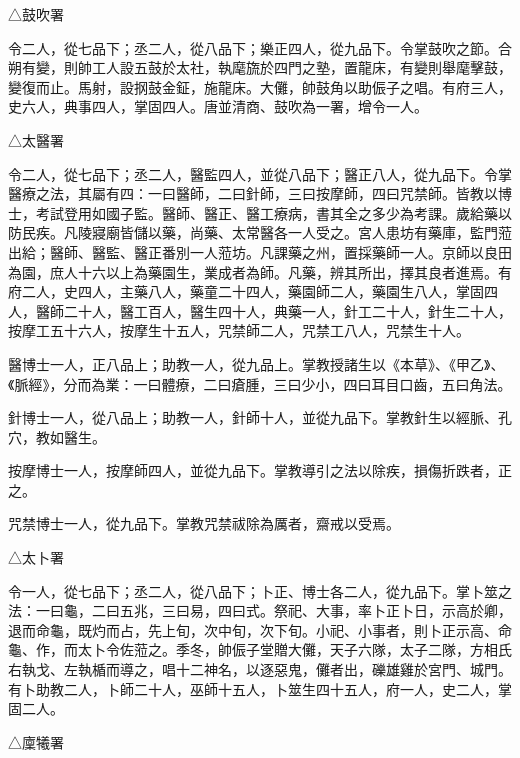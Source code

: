 \begin{pinyinscope}
 △鼓吹署



 令二人，從七品下；丞二人，從八品下；樂正四人，從九品下。令掌鼓吹之節。合朔有變，則帥工人設五鼓於太社，執麾旒於四門之塾，置龍床，有變則舉麾擊鼓，變復而止。馬射，設㧏鼓金鉦，施龍床。大儺，帥鼓角以助侲子之唱。有府三人，史六人，典事四人，掌固四人。唐並清商、鼓吹為一署，增令一人。



 △太醫署



 令二人，從七品下；丞二人，醫監四人，並從八品下；醫正八人，從九品下。令掌醫療之法，其屬有四：一曰醫師，二曰針師，三曰按摩師，四曰咒禁師。皆教以博士，考試登用如國子監。醫師、醫正、醫工療病，書其全之多少為考課。歲給藥以防民疾。凡陵寢廟皆儲以藥，尚藥、太常醫各一人受之。宮人患坊有藥庫，監門蒞出給；醫師、醫監、醫正番別一人蒞坊。凡課藥之州，置採藥師一人。京師以良田為園，庶人十六以上為藥園生，業成者為師。凡藥，辨其所出，擇其良者進焉。有府二人，史四人，主藥八人，藥童二十四人，藥園師二人，藥園生八人，掌固四人，醫師二十人，醫工百人，醫生四十人，典藥一人，針工二十人，針生二十人，按摩工五十六人，按摩生十五人，咒禁師二人，咒禁工八人，咒禁生十人。



 醫博士一人，正八品上；助教一人，從九品上。掌教授諸生以《本草》、《甲乙》、《脈經》，分而為業：一曰體療，二曰瘡腫，三曰少小，四曰耳目口齒，五曰角法。



 針博士一人，從八品上；助教一人，針師十人，並從九品下。掌教針生以經脈、孔穴，教如醫生。



 按摩博士一人，按摩師四人，並從九品下。掌教導引之法以除疾，損傷折跌者，正之。



 咒禁博士一人，從九品下。掌教咒禁祓除為厲者，齋戒以受焉。



 △太卜署



 令一人，從七品下；丞二人，從八品下；卜正、博士各二人，從九品下。掌卜筮之法：一曰龜，二曰五兆，三曰易，四曰式。祭祀、大事，率卜正卜日，示高於卿，退而命龜，既灼而占，先上旬，次中旬，次下旬。小祀、小事者，則卜正示高、命龜、作，而太卜令佐蒞之。季冬，帥侲子堂贈大儺，天子六隊，太子二隊，方相氏右執戈、左執楯而導之，唱十二神名，以逐惡鬼，儺者出，礫雄雞於宮門、城門。有卜助教二人，卜師二十人，巫師十五人，卜筮生四十五人，府一人，史二人，掌固二人。



 △廩犧署




\end{pinyinscope}
